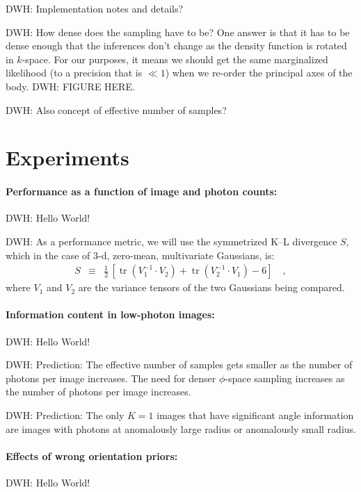 \documentclass[12pt]{article}
\DeclareMathOperator{\trace}{tr}
\begin{document}
DWH: Implementation notes and details?

DWH: How dense does the sampling have to be?  One answer is that it
has to be dense enough that the inferences don't change as the density
function is rotated in $k$-space.  For our purposes, it means we
should get the same marginalized likelihood (to a precision that is
$\ll 1$) when we re-order the principal axes of the body.  DWH: FIGURE HERE.

DWH: Also concept of effective number of samples?

\section{Experiments}

\paragraph{Performance as a function of image and photon counts:}
DWH: Hello World!

DWH: As a performance metric, we will use the symmetrized K--L
divergence $S$, which in the case of 3-d, zero-mean, multivariate
Gaussians, is:
\begin{eqnarray}
  S &\equiv& \frac{1}{2}\,\left[\trace(V_1^{-1}\cdot V_2)
                              + \trace(V_2^{-1}\cdot V_1)
                              - 6\right]
  \quad,
\end{eqnarray}
where $V_1$ and $V_2$ are the variance tensors of the two Gaussians
being compared.

\paragraph{Information content in low-photon images:}
DWH: Hello World!

DWH: Prediction: The effective number of samples gets smaller as the
number of photons per image increases.  The need for denser
$\phi$-space sampling increases as the number of photons per image
increases.

DWH: Prediction: The only $K=1$ images that have significant angle
information are images with photons at anomalously large radius or
anomalously small radius.

\paragraph{Effects of wrong orientation priors:}
DWH: Hello World!
\end{document}
